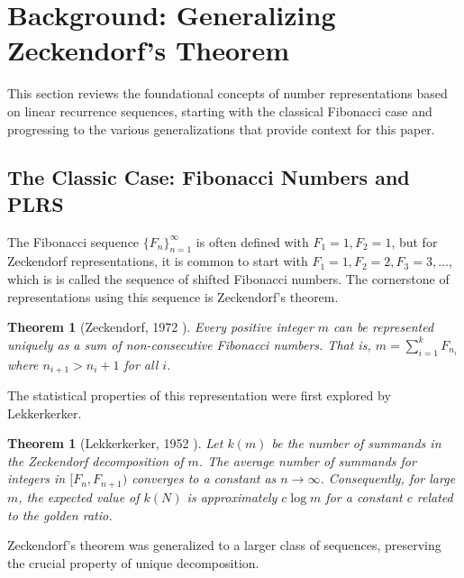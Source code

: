 \documentclass[11pt]{amsart}
\theoremstyle{plain}
\numberwithin{equation}{section} %
\newtheorem{theorem}[thm]{Theorem}
\numberwithin{table}{section} %
\numberwithin{figure}{section}
\begin{document}
	
	
	
	\section{Background: Generalizing Zeckendorf's Theorem}
	This section reviews the foundational concepts of number representations based on linear recurrence sequences, starting with the classical Fibonacci case and progressing to the various generalizations that provide context for this paper.
	
	\subsection{The Classic Case: Fibonacci Numbers and PLRS}
	The Fibonacci sequence $\{F_n\}_{n=1}^\infty$ is often defined with $F_1=1, F_2=1$, but for Zeckendorf representations, it is common to start with $F_1=1, F_2=2, F_3=3, \dots$, which is is called the sequence of shifted Fibonacci numbers.  The cornerstone of representations using this sequence is Zeckendorf's theorem.
	
	\begin{theorem}[Zeckendorf, 1972 \cite{zeckendorf1972}]
		Every positive integer $m$ can be represented uniquely as a sum of non-consecutive Fibonacci numbers. That is, $m = \sum_{i=1}^k F_{n_i}$ where $n_{i+1} > n_i + 1$ for all $i$.
	\end{theorem}
	
	The statistical properties of this representation were first explored by Lekkerkerker.
	
	\begin{theorem}[Lekkerkerker, 1952 \cite{lekkerkerker1952}]
		Let $k(m)$ be the number of summands in the Zeckendorf decomposition of $m$. The average number of summands for integers in $[F_n, F_{n+1})$ converges to a constant as $n \to \infty$. Consequently, for large $m$, the expected value of $k(N)$ is approximately $c \log m$ for a constant $c$ related to the golden ratio.
	\end{theorem}
	
	Zeckendorf's theorem was generalized to a larger class of sequences, preserving the crucial property of unique decomposition.
	
\end{document}
